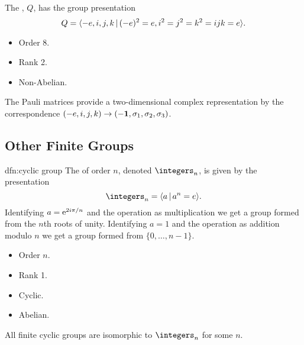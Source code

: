 \begin{dfn}{}{}
    The , \(Q\), has the group presentation
    \begin{equation}
        Q = \presentation{-e, i, j, k}{(-e)^2 = e, i^2 = j^2 = k^2 = ijk = e}.
    \end{equation}
    
    \begin{multicols}{2}
        \begin{itemize}
            \item Order 8.
            \item Rank 2.
            \item Non-Abelian.
        \end{itemize}
    \end{multicols}
    The Pauli matrices provide a two-dimensional complex representation by the correspondence \((-e, i, j, k) \to (-\mathbf{1}, \sigma_1, \sigma_2, \sigma_3)\).
\end{dfn}

\subsection{Other Finite Groups}
\begin{dfn}{}{dfn:cyclic group}
    The  of order \(n\), denoted \(\integers_n\), is given by the presentation
    \begin{equation}
        \integers_n = \presentation{a}{a^n = e}.
    \end{equation}
    Identifying \(a = \mathrm{e}^{2i\pi/n}\) and the operation as multiplication we get a group formed from the \(n\)th roots of unity.
    Identifying \(a = 1\) and the operation as addition modulo \(n\) we get a group formed from \(\{0, \dotsc, n-1\}\).
    
    \begin{multicols}{2}
        \begin{itemize}
            \item Order \(n\).
            \item Rank 1.
            \item Cyclic.
            \item Abelian.
        \end{itemize}
    \end{multicols}
    All finite cyclic groups are isomorphic to \(\integers_n\) for some \(n\).
\end{dfn}

